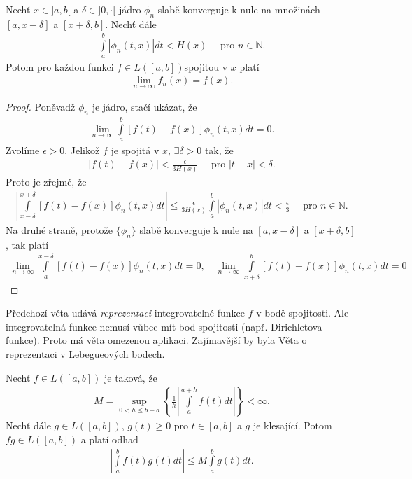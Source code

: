 \begin{theorem}[Lebesgue]\label{v_4.4}
Nechť $x \in ]a,b[$ a $\delta \in ]0,\cdot[$ jádro $\phi_n$ slabě konverguje k nule na množinách $[a, x - \delta]$ a $[x + \delta, b]$. Nechť dále
\begin{align*}
\int \limits_a^b |\phi_n (t,x)| dt < H(x) \quad \textrm{ pro } n \in \mathbb{N}.
\end{align*}
Potom pro každou funkci $f \in L([a,b])$spojitou v $x$ platí
\begin{align*}
\lim_{n \rightarrow \infty} f_n(x) = f(x).
\end{align*}
\begin{proof}
Poněvadž $\phi_n$ je jádro, stačí ukázat, že
\begin{align*}
\lim_{n \rightarrow \infty} \int \limits_a^b [f(t) - f(x)] \phi_n (t,x) dt = 0.
\end{align*}
Zvolíme $\epsilon > 0$. Jelikož $f$ je spojitá v $x$, $\exists \delta > 0$ tak, že
\begin{align*}
|f(t) - f(x)| < \frac{\epsilon}{3H(x)} \quad \textrm{ pro } |t-x| < \delta.
\end{align*}
Proto je zřejmé, že
\begin{align*}
\left| \int \limits_{x - \delta}^{x + \delta} [f(t) - f(x)] \phi_n (t,x) dt \right| \leq \frac{\epsilon}{3H(x)} \int \limits_a^b |\phi_n (t,x)| dt < \frac{\epsilon}{3} \quad \textrm{ pro } n \in \mathbb{N}.
\end{align*}
Na druhé straně, protože $\{ \phi_n \}$ slabě konverguje k nule na $[a, x - \delta]$ a $[x + \delta, b]$, tak platí
\begin{align*}
\lim \limits _{n \to \infty} \int \limits_a^{x - \delta} [f(t) - f(x)] \phi_n (t,x) dt = 0, \quad \lim \limits _{n \to \infty} \int \limits_{x + \delta}^b [f(t) - f(x)] \phi_n (t,x) dt = 0
\end{align*}
\end{proof}
\end{theorem}

\begin{poznamka}\label{p_4.5a}
Předchozí věta udává \textit{reprezentaci} integrovatelné funkce $f$ v bodě spojitosti. Ale integrovatelná funkce nemusí vůbec mít bod spojitosti (např. Dirichletova funkce). Proto má věta omezenou aplikaci. Zajímavější by byla Věta o reprezentaci v Lebegueových bodech.
\end{poznamka}

\begin{lemma}[Natanson]\label{l_4.6_Natanson}
Nechť $f \in L([a,b])$ je taková, že
\begin{align*}
M = \sup_{0 < h \leq b-a} \left\{ \frac{1}{h} \left| \int \limits_a^{a+h} f(t) dt \right| \right\} < \infty.
\end{align*}
Nechť dále $g \in L([a,b])$, $g(t) \geq 0$ pro $t \in [a,b]$ a $g$ je klesající. Potom $fg \in L([a,b])$ a platí odhad
\begin{align*}
\left| \int \limits_a^b f(t) g(t) dt \right| \leq M \int \limits_a^b g(t) dt.
\end{align*}
\end{lemma}

